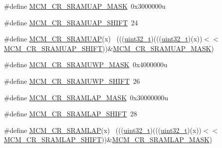 \begin{DoxyCompactItemize}
\item 
\#define \hyperlink{group___m_c_m___register___masks_ga39213f9a00cf1862ab3e77c839e71c78}{M\+C\+M\+\_\+\+C\+R\+\_\+\+S\+R\+A\+M\+U\+A\+P\+\_\+\+M\+A\+SK}~0x3000000u
\item 
\#define \hyperlink{group___m_c_m___register___masks_ga4608d3fb1b05eb0d37515c4686f6190c}{M\+C\+M\+\_\+\+C\+R\+\_\+\+S\+R\+A\+M\+U\+A\+P\+\_\+\+S\+H\+I\+FT}~24
\item 
\#define \hyperlink{group___m_c_m___register___masks_ga20439b64822acaa2e80c35f0ac3ef4c6}{M\+C\+M\+\_\+\+C\+R\+\_\+\+S\+R\+A\+M\+U\+AP}(x)                                            ~(((\hyperlink{_p_e___types_8h_a33594304e786b158f3fb30289278f5af}{uint32\+\_\+t})(((\hyperlink{_p_e___types_8h_a33594304e786b158f3fb30289278f5af}{uint32\+\_\+t})(x))$<$$<$\hyperlink{group___m_c_m___register___masks_ga4608d3fb1b05eb0d37515c4686f6190c}{M\+C\+M\+\_\+\+C\+R\+\_\+\+S\+R\+A\+M\+U\+A\+P\+\_\+\+S\+H\+I\+FT}))\&\hyperlink{group___m_c_m___register___masks_ga39213f9a00cf1862ab3e77c839e71c78}{M\+C\+M\+\_\+\+C\+R\+\_\+\+S\+R\+A\+M\+U\+A\+P\+\_\+\+M\+A\+SK})
\item 
\#define \hyperlink{group___m_c_m___register___masks_ga80116d649929d7c9ad773cebd4e4c3bb}{M\+C\+M\+\_\+\+C\+R\+\_\+\+S\+R\+A\+M\+U\+W\+P\+\_\+\+M\+A\+SK}~0x4000000u
\item 
\#define \hyperlink{group___m_c_m___register___masks_ga73c2b0e8ecdcd2a07070c863db3e9fcd}{M\+C\+M\+\_\+\+C\+R\+\_\+\+S\+R\+A\+M\+U\+W\+P\+\_\+\+S\+H\+I\+FT}~26
\item 
\#define \hyperlink{group___m_c_m___register___masks_gad9a5f5487e03cefac1a4798ccce630bc}{M\+C\+M\+\_\+\+C\+R\+\_\+\+S\+R\+A\+M\+L\+A\+P\+\_\+\+M\+A\+SK}~0x30000000u
\item 
\#define \hyperlink{group___m_c_m___register___masks_ga083d0b4e4188e656d92bfa8fb9b4eca9}{M\+C\+M\+\_\+\+C\+R\+\_\+\+S\+R\+A\+M\+L\+A\+P\+\_\+\+S\+H\+I\+FT}~28
\item 
\#define \hyperlink{group___m_c_m___register___masks_ga264b34607cdb5067dbc84ea7f2558d29}{M\+C\+M\+\_\+\+C\+R\+\_\+\+S\+R\+A\+M\+L\+AP}(x)                                            ~(((\hyperlink{_p_e___types_8h_a33594304e786b158f3fb30289278f5af}{uint32\+\_\+t})(((\hyperlink{_p_e___types_8h_a33594304e786b158f3fb30289278f5af}{uint32\+\_\+t})(x))$<$$<$\hyperlink{group___m_c_m___register___masks_ga083d0b4e4188e656d92bfa8fb9b4eca9}{M\+C\+M\+\_\+\+C\+R\+\_\+\+S\+R\+A\+M\+L\+A\+P\+\_\+\+S\+H\+I\+FT}))\&\hyperlink{group___m_c_m___register___masks_gad9a5f5487e03cefac1a4798ccce630bc}{M\+C\+M\+\_\+\+C\+R\+\_\+\+S\+R\+A\+M\+L\+A\+P\+\_\+\+M\+A\+SK})

\end{DoxyCompactItemize}

